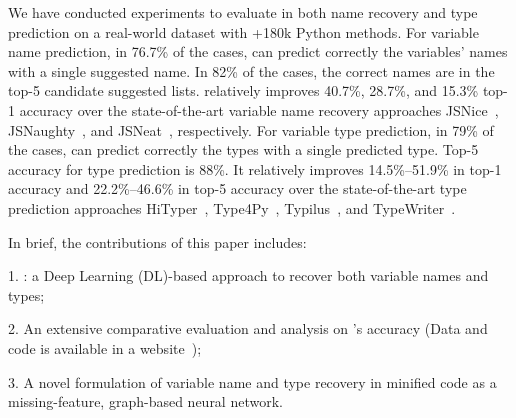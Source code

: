 We have conducted experiments to evaluate {\tool} in both name
recovery and type prediction on a real-world dataset with +180k Python
methods. For variable name prediction, in 76.7\% of the cases, {\tool}
can predict correctly the variables' names with a single suggested
name. In 82\% of the cases, the correct names are in the top-5
candidate suggested lists. {\tool} relatively improves 40.7\%, 28.7\%,
and 15.3\% top-1 accuracy over the state-of-the-art variable name
recovery approaches JSNice~\cite{JSNice2015},
JSNaughty~\cite{JSNaughty2017}, and JSNeat~\cite{icse19},
respectively. For variable type prediction, in 79\% of the cases,
{\tool} can predict correctly the types with a single predicted type.
Top-5 accuracy for type prediction is 88\%. It relatively improves
14.5\%--51.9\% in top-1 accuracy and 22.2\%--46.6\% in top-5 accuracy
over the state-of-the-art type prediction approaches
HiTyper~\cite{HiTyper-icse22}, Type4Py~\cite{Type4Py-icse22},
Typilus~\cite{typilus-pldi20}, and TypeWriter~\cite{typewriter-fse20}.

In brief, the contributions of this paper includes:

1. {\bf {\tool}}: a Deep Learning (DL)-based approach to recover both
variable names and types;

2. An extensive comparative evaluation and analysis on {\tool}'s
accuracy (Data and code is available in a
website~\cite{deminify-website});

3. A novel formulation of variable name and type recovery in
minified code as a missing-feature, graph-based neural network.
